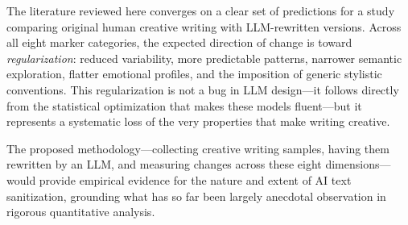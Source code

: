 \documentclass[12pt,a4paper]{article}
\begin{document}
The literature reviewed here converges on a clear set of predictions for a study comparing original human creative writing with LLM-rewritten versions. Across all eight marker categories, the expected direction of change is toward \emph{regularization}: reduced variability, more predictable patterns, narrower semantic exploration, flatter emotional profiles, and the imposition of generic stylistic conventions. This regularization is not a bug in LLM design---it follows directly from the statistical optimization that makes these models fluent---but it represents a systematic loss of the very properties that make writing creative.

The proposed methodology---collecting creative writing samples, having them rewritten by an LLM, and measuring changes across these eight dimensions---would provide empirical evidence for the nature and extent of AI text sanitization, grounding what has so far been largely anecdotal observation in rigorous quantitative analysis.


\end{document}
